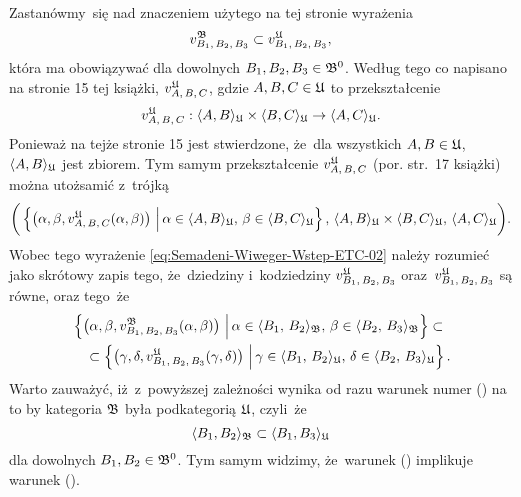 \documentclass[a4paper,11pt]{article}
\numberwithin{equation}{section}
\begin{document}
\noindent
{} Zastanówmy~się nad znaczeniem użytego na tej stronie wyrażenia
\begin{equation}
  \label{eq:Semadeni-Wiweger-Wstep-ETC-02}
  v_{ B_{ 1 }, \, B_{ 2 }, \, B_{ 3 } }^{ \mathfrak{B} } \subset
  v_{ B_{ 1 }, \, B_{ 2 }, \, B_{ 3 } }^{ \mathfrak{U} },
\end{equation}
która ma obowiązywać dla dowolnych $B_{ 1 }, B_{ 2 }, B_{ 3 } \in \mathfrak{B}^{ 0 }$.
Według tego co napisano na stronie 15 tej książki,
$v_{ A, \, B, \, C }^{ \mathfrak{U} }$, gdzie $A, B, C \in \mathfrak{U}$ to przekształcenie
\begin{equation}
  \label{eq:Semadeni-Wiweger-Wstep-ETC-03}
  v_{ A, \, B, \, C }^{ \mathfrak{U} } :
  \langle A, B \rangle_{ \mathfrak{U} } \times \langle B, C \rangle_{ \mathfrak{U} } \to
  \langle A, C \rangle_{ \mathfrak{U} }.
\end{equation}
Ponieważ na tejże stronie 15 jest stwierdzone, że~dla wszystkich
$A, B \in \mathfrak{U}$, $\langle A, B \rangle_{ \mathfrak{U} }$ jest zbiorem. Tym samym przekształcenie
$v_{ A, \, B, \, C }^{ \mathfrak{U} }$ (por. str.~17 książki) można utożsamić z~trójką
\begin{equation}
  \label{eq:Semadeni-Wiweger-Wstep-ETC-04}
  \bigg( \left\{ \left(\alpha, \beta, v_{ A, \, B, \, C }^{ \mathfrak{U} }( \alpha, \beta )
    \right) \, \Big| \,
    \alpha \in \langle A, B \rangle_{ \mathfrak{U} }, \, \beta \in \langle B, C \rangle_{ \mathfrak{U} } \right\}, \,
  \langle A, B \rangle_{ \mathfrak{U} } \times \langle B, C \rangle_{ \mathfrak{U} }, \,
  \langle A, C \rangle_{ \mathfrak{U} } \bigg).
\end{equation}
Wobec tego wyrażenie \eqref{eq:Semadeni-Wiweger-Wstep-ETC-02} należy rozumieć
jako skrótowy zapis tego, że~dziedziny i~kodziedziny
$v_{ B_{ 1 }, \, B_{ 2 }, \, B_{ 3 } }^{ \mathfrak{U} }$
oraz~$v_{ B_{ 1 }, \, B_{ 2 }, \, B_{ 3 } }^{ \mathfrak{U} }$ są równe, oraz tego~że
\begin{equation}
  \label{eq:Semadeni-Wiweger-Wstep-ETC-05}
  \begin{split}
    &\left\{ \left( \alpha, \beta,
      v_{ B_{ 1 }, \, B_{ 2 }, \, B_{ 3 } }^{ \mathfrak{B} }( \alpha, \beta )
      \right)
      \, \Big| \,
      \alpha \in \langle B_{ 1 }, \, B_{ 2 } \rangle_{ \mathfrak{B} }, \,
      \beta \in \langle B_{ 2 }, \, B_{ 3 } \rangle_{ \mathfrak{B} } \right\}
      \subset \\
    &\quad
      \subset
      \left\{ \left( \gamma, \delta,
      v_{ B_{ 1 }, \, B_{ 2 }, \, B_{ 3 } }^{ \mathfrak{U} }( \gamma, \delta )
      \right)
      \, \Big| \,
      \gamma \in \langle B_{ 1 }, \, B_{ 2 } \rangle_{ \mathfrak{U} }, \,
      \delta \in \langle B_{ 2 }, \, B_{ 3 } \rangle_{ \mathfrak{U} } \right\}.
  \end{split}
\end{equation}
Warto zauważyć, iż~z~powyższej zależności wynika od razu warunek numer
() na to by kategoria $\mathfrak{B}$ była podkategorią $\mathfrak{U}$,
czyli~że
\begin{equation}
  \label{eq:Semadeni-Wiweger-Wstep-ETC-06}
  \langle B_{ 1 }, B_{ 2 } \rangle_{ \mathfrak{B} } \subset \langle B_{ 1 }, B_{ 3 } \rangle_{ \mathfrak{U} }
\end{equation}
dla dowolnych $B_{ 1 }, B_{ 2 } \in \mathfrak{B}^{ 0 }$. Tym samym widzimy,
że~warunek () implikuje warunek ().
\end{document}

